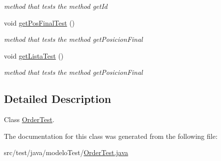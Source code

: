 \begin{DoxyCompactItemize}
\begin{DoxyCompactList}\small\item\em method that tests the method get\+Id \end{DoxyCompactList}\item 
\mbox{\label{classmodelo_test_1_1_order_test_a7c06f3d3988acc930549e1655299d444}} 
void \mbox{\hyperlink{classmodelo_test_1_1_order_test_a7c06f3d3988acc930549e1655299d444}{get\+Pos\+Final\+Test}} ()
\begin{DoxyCompactList}\small\item\em method that tests the method get\+Posicion\+Final \end{DoxyCompactList}\item 
\mbox{\label{classmodelo_test_1_1_order_test_a1e60baf67b5be0d46cec211518d94dd5}} 
void \mbox{\hyperlink{classmodelo_test_1_1_order_test_a1e60baf67b5be0d46cec211518d94dd5}{get\+Lista\+Test}} ()
\begin{DoxyCompactList}\small\item\em method that tests the method get\+Posicion\+Final \end{DoxyCompactList}\end{DoxyCompactItemize}


\subsection{Detailed Description}
Class \mbox{\hyperlink{classmodelo_test_1_1_order_test}{Order\+Test}}. 

The documentation for this class was generated from the following file\+:\begin{DoxyCompactItemize}
\item 
src/test/java/modelo\+Test/\mbox{\hyperlink{_order_test_8java}{Order\+Test.\+java}}\end{DoxyCompactItemize}
